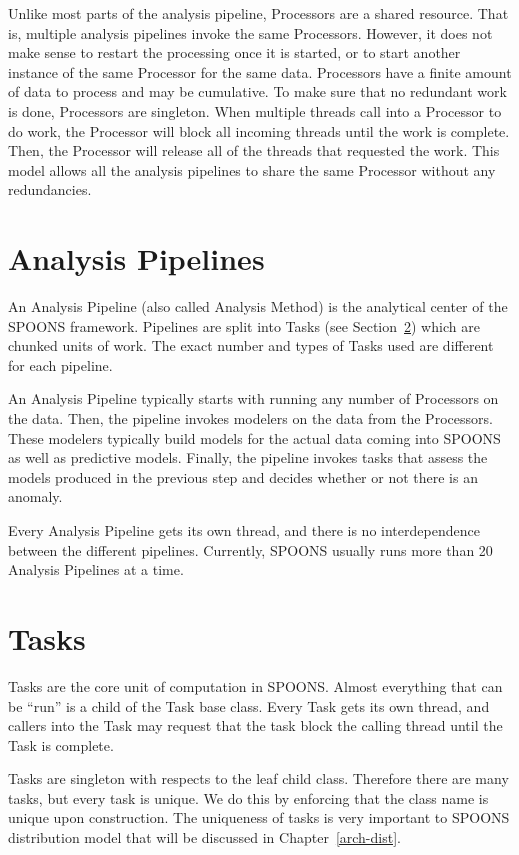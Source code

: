\documentclass[12pt]{ucthesis}
\begin{document}
Unlike most parts of the analysis pipeline, Processors are a shared resource. That is, multiple analysis pipelines
invoke the same Processors. However, it does not make sense to restart the processing once it is started, or to
start another instance of the same Processor for the same data. Processors have a finite amount of data to process and may be cumulative.
To make sure that no redundant work is done, Processors are singleton. When multiple threads call into a Processor to do work, the Processor will block
all incoming threads until the work is complete. Then, the Processor will release all of the threads that requested the work.
This model allows all the analysis pipelines to share the same Processor without any redundancies.

\section{Analysis Pipelines}
\label{arch-pipelines}
An Analysis Pipeline (also called Analysis Method) is the analytical center of the SPOONS framework.
Pipelines are split into Tasks (see Section~\ref{arch-tasks}) which are chunked units of work.
The exact number and types of Tasks used are different for each pipeline.

An Analysis Pipeline typically starts with running any number of Processors on the data.
Then, the pipeline invokes modelers on the data from the Processors. These modelers typically build models for the
actual data coming into SPOONS as well as predictive models.
Finally, the pipeline invokes tasks that assess the models produced in the previous
step and decides whether or not there is an anomaly.

Every Analysis Pipeline gets its own thread, and there is no interdependence between the different pipelines.
Currently, SPOONS usually runs more than 20 Analysis Pipelines at a time.

\section{Tasks}
\label{arch-tasks}
Tasks are the core unit of computation in SPOONS. Almost everything that can be ``run'' is a child of the Task base
class. Every Task gets its own thread, and callers into the Task may request that the task block the calling thread
until the Task is complete.

Tasks are singleton with respects to the leaf child class. Therefore there are many tasks, but every task is
unique. We do this by enforcing that the class name is unique upon construction. The uniqueness of tasks is very
important to SPOONS distribution model that will be discussed in Chapter~\ref{arch-dist}.
\end{document}
